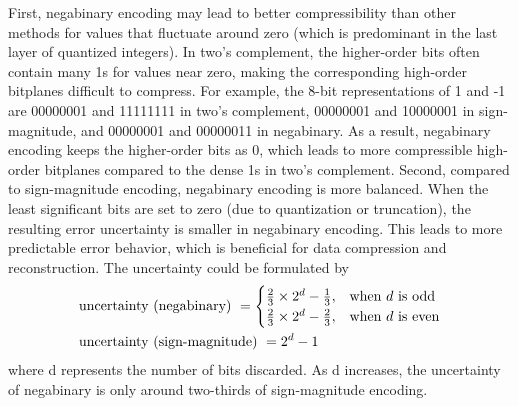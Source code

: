 First, negabinary encoding may lead to better compressibility than other methods for values that fluctuate around zero (which is predominant in the last layer of quantized integers). In two's complement, the higher-order bits often contain many 1s for values near zero, making the corresponding high-order bitplanes difficult to compress. For example, the 8-bit representations of 1 and -1 are 00000001 and 11111111 in two's complement, 00000001 and 10000001 in sign-magnitude, and  00000001 and 00000011 in negabinary. As a result, negabinary encoding keeps the higher-order bits as 0, which leads to more compressible high-order bitplanes compared to the dense 1s in two's complement.
Second, compared to sign-magnitude encoding, negabinary encoding is more balanced. When the least significant bits are set to zero (due to quantization or truncation), the resulting error uncertainty is smaller in negabinary encoding. This leads to more predictable error behavior, which is beneficial for data compression and reconstruction.
The uncertainty could be formulated by
    \[
    \begin{aligned}
       & \text{uncertainty (negabinary) } = 
        \begin{cases}
                \frac{2}{3}\times2^d-\frac{1}{3}
            , & \text{when } d \text{ is odd} \\
                \frac{2}{3}\times2^d-\frac{2}{3}, & \text{when } d \text{ is even}
        \end{cases}\\
    & \text{uncertainty (sign-magnitude) }  = 2^d-1
    \label{eq:uncertainty}
    \end{aligned}\\
    \]
where d represents the number of bits discarded. As d increases, the uncertainty of negabinary is only around two-thirds of sign-magnitude encoding.







